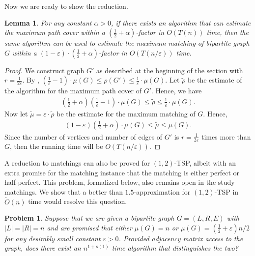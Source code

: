 \documentclass[letterpaper,11pt]{article}
\renewcommand{\epsilon}{\varepsilon}
\newtheorem{lemma}[theorem]{Lemma}
\newtheorem{problem}[theorem]{Problem}
\newenvironment{myproof}{
\vspace{-0.5cm}
\begin{proof}
}{
\end{proof}
}
\begin{document}
Now we are ready to show the reduction.

\begin{lemma}
For any constant $\alpha > 0$, if there exists an algorithm that can estimate the maximum path cover within a $(\frac{1}{2} + \alpha)$-factor in $O(T(n))$ time, then the same algorithm can be used to estimate the maximum matching of bipartite graph $G$ within a $(1 - \epsilon)\cdot (\frac{1}{2} + \alpha)$-factor in $O(T(n/\epsilon))$ time.
\end{lemma}
\begin{myproof}
We construct graph $G'$ as described at the beginning of the section with $r = \frac{1}{2\epsilon}$. By , $(\frac{1}{\epsilon}-1)\cdot\mu(G) \leq \rho(G') \leq \frac{1}{\epsilon}\cdot \mu(G)$. Let $\tilde{\rho}$ be the estimate of the algorithm for the maximum path cover of $G'$. Hence, we have 
\begin{align*}
    (\frac{1}{2} + \alpha)(\frac{1}{\epsilon}-1)\cdot\mu(G) \leq \tilde{\rho} \leq \frac{1}{\epsilon}\cdot \mu(G).
\end{align*}
Now let $\tilde{\mu} = \epsilon\cdot\tilde{\rho}$ be the estimate for the maximum matching of $G$. Hence, 
\begin{align*}
    (1-\epsilon)(\frac{1}{2} + \alpha)\cdot\mu(G) \leq \tilde{\mu} \leq \mu(G).
\end{align*}
Since the number of vertices and number of edges of $G'$ is $r=\frac{1}{2\epsilon}$ times more than $G$, then the running time will be $O(T(n/\epsilon))$.
\end{myproof}


A reduction to matchings can also be proved for $(1,2)$-TSP, albeit with an extra promise for the matching instance that the matching is either perfect or half-perfect. This problem, formalized below, also remains open in the study matchings. We show that a better than $1.5$-approximation for $(1,2)$-TSP in $\widetilde{O}(n)$ time would resolve this question.

\begin{problem}\label{problem:matching-promised}
Suppose that we are given a bipartite graph $G=(L, R, E)$ with $|L| = |R| = n$ and are promised that either $\mu(G) = n$ or $\mu(G) = (\frac{1}{2}+\epsilon)n/2$ for any desirably small constant $\epsilon > 0$. Provided adjacency matrix access to the graph, does there exist an $n^{1+o(1)}$ time algorithm that distinguishes the two?
\end{problem}
\end{document}
